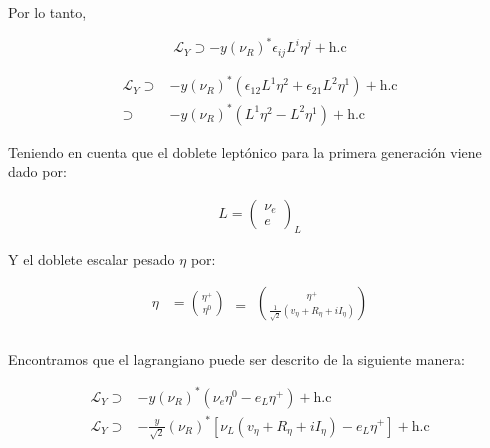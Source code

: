 \documentclass[12pt]{article}
\begin{document}
Por lo tanto, 

\begin{equation}
    \label{eq:SecondYu}
    \mathcal{L}_Y \supset  -y (\nu_R)^* \epsilon_{ij}{L}^i \eta^j+ \text{h.c}
\end{equation}

\begin{equation}
    \label{eq:Third}
    \begin{aligned}
    \mathcal{L}_Y \supset&  -y (\nu_R)^* (\epsilon_{12}{L}^1 \eta^2+\epsilon_{21}{L}^2 \eta^1)+ \text{h.c} \nonumber\\
     \supset &  -y (\nu_R)^* ({L}^1 \eta^2-{L}^2 \eta^1)+ \text{h.c} \nonumber
    \end{aligned}
\end{equation}

Teniendo en cuenta que el doblete leptónico para la primera generación viene dado por: 

\begin{align}
L =\begin{pmatrix}
 \nu_e\\
 e
\end{pmatrix}_L
\end{align}

Y el doblete escalar pesado $\eta$ por:

\begin{equation}
\begin{aligned}
 \eta & = \binom{\eta^{+}}{\eta^{0} } \\ 
\end{aligned} = 
\begin{aligned}
 \binom{\eta^{+}}{\frac{1}{\sqrt{2}}(v_\eta + R_\eta + iI_\eta) } \\ 
\end{aligned}
\end{equation} \\

Encontramos que el lagrangiano puede ser descrito de la siguiente manera:


\begin{equation}
    \label{eq:LagrangianoYu}
    \begin{aligned}
     \mathcal{L}_Y \supset&  -y (\nu_R)^* (\nu_e \eta^0-e_L \eta^+)+ \text{h.c} \nonumber\\
\mathcal{L}_Y \supset&  -\frac{y}{\sqrt{2}} (\nu_R)^* [\nu_L(v_\eta+R_\eta+i I_\eta) -e_L \eta^+]+ \text{h.c} \nonumber\\
    \end{aligned}
\end{equation}
\end{document}
